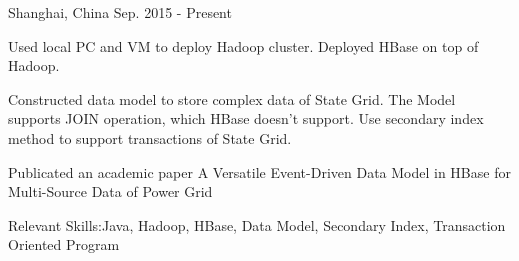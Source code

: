 \begin{cventries}
    {Shanghai, China}
    {Sep. 2015 - Present}
    {
      \begin{cvitems}
      \vspace{-10pt}
        \item {Used local PC and VM to deploy Hadoop cluster. Deployed HBase on top of Hadoop.}
        \item {Constructed data model to store complex data of State Grid.  The Model supports JOIN operation, which HBase doesn't support. Use secondary index method to support transactions of State Grid.}
        \item{Publicated an academic paper A Versatile Event-Driven Data Model in HBase for Multi-Source Data of Power Grid}
        \item{Relevant Skills:Java, Hadoop, HBase, Data Model, Secondary Index, Transaction Oriented Program}
      \end{cvitems}
    }

\end{cventries}
